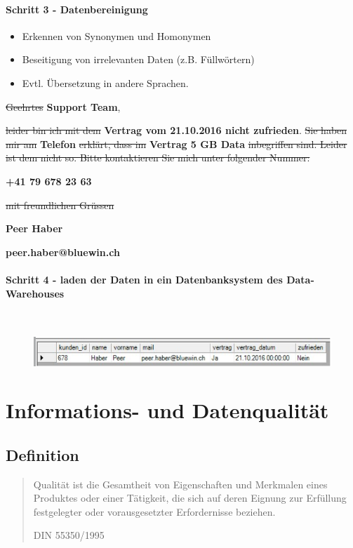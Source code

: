 \documentclass[a4paper, 11pt, nofootinbib]{article}
\begin{document}
\paragraph{Schritt 3 - Datenbereinigung}
\begin{itemize}
	\item Erkennen von Synonymen und Homonymen
	\item Beseitigung von irrelevanten Daten (z.B. Füllwörtern)
	\item Evtl. Übersetzung in andere Sprachen.
\end{itemize}

\noindent \sout{Geehrtes} \textbf{Support Team},

\noindent \sout{leider bin ich mit dem} \textbf{Vertrag vom 21.10.2016 nicht zufrieden}. \sout{Sie
haben mir am} \textbf{Telefon}\sout{ erklärt, dass im} \textbf{ Vertrag 5 GB Data} \sout{inbegriffen
sind. Leider ist dem nicht so. Bitte kontaktieren Sie mich unter folgender Nummer:}

\noindent \textbf{+41 79 678 23 63}

\noindent \sout{mit freundlichen Grüssen}

\noindent \textbf{Peer Haber}

\noindent \textbf{peer.haber@bluewin.ch}

\paragraph{Schritt 4 - laden der Daten in ein Datenbanksystem des Data-Warehouses}\mbox{} \\

\begin{figure}[htb]
	\centering
	\includegraphics[keepaspectratio=true,height=3.5\baselineskip]{haber_peer.PNG}
\end{figure}

\section{Informations- und Datenqualität}
\subsection{Definition}
\blockquote[DIN 55350/1995]{Qualität ist die Gesamtheit von Eigenschaften und Merkmalen eines Produktes oder einer Tätigkeit, die sich auf deren Eignung zur Erfüllung festgelegter oder vorausgesetzter Erfordernisse beziehen.}
\vspace{10px}
\end{document}
